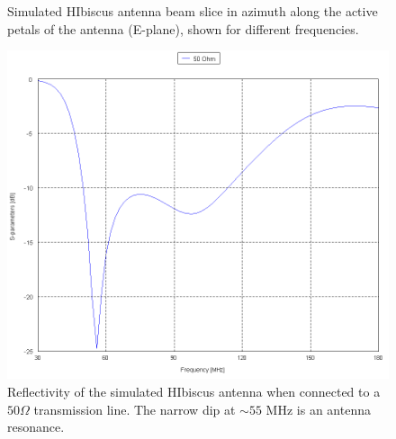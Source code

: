 \begin{figure}[htb]
\begin{minipage}[b]{0.47\textwidth}
\caption{Simulated HIbiscus antenna beam slice in azimuth along the active petals of the antenna (E-plane), shown for different frequencies.}
\label{Fig:HIsym_beam_2}
\end{minipage}
\end{figure}
 
\begin{figure}[htb]
\centering
\begin{minipage}[b]{0.49\textwidth}
\centering
\includegraphics[width=0.95\linewidth]{SCIHI_system/figures/HIbiscus_S11_50_Cart.png}
\caption{Reflectivity of the simulated HIbiscus antenna when connected to a $50 \Omega$ transmission line. The narrow dip at $\sim 55$ MHz is an antenna resonance. }
\label{Fig:HIsim_S11_dB}
\end{minipage}%
\begin{minipage}[b]{0.02\textwidth}
\hspace{1cm}
\end{minipage}%
\begin{minipage}[b]{0.46\textwidth}
\centering

\end{minipage}
\end{figure}
